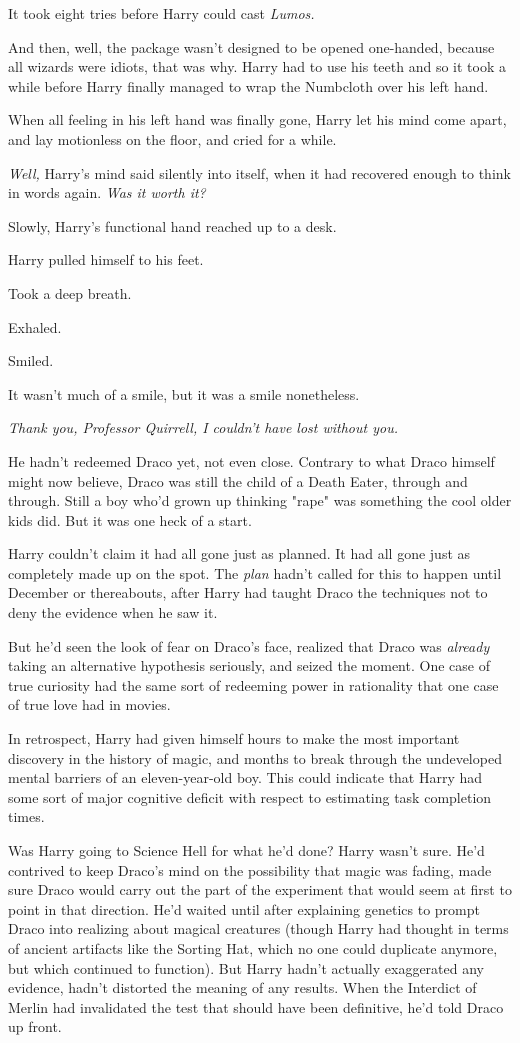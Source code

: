 It took eight tries before Harry could cast \emph{Lumos.}

And then, well, the package wasn't designed to be opened one-handed, because 
all wizards were idiots, that was why. Harry had to use his teeth and so it 
took a while before Harry finally managed to wrap the Numbcloth over his left 
hand.

When all feeling in his left hand was finally gone, Harry let his mind come 
apart, and lay motionless on the floor, and cried for a while.

\emph{Well,} Harry's mind said silently into itself, when it had recovered 
enough to think in words again. \emph{Was it worth it?}

Slowly, Harry's functional hand reached up to a desk.

Harry pulled himself to his feet.

Took a deep breath.

Exhaled.

Smiled.

It wasn't much of a smile, but it was a smile nonetheless.

\emph{Thank you, Professor Quirrell, I couldn't have lost without you.}

He hadn't redeemed Draco yet, not even close. Contrary to what Draco himself 
might now believe, Draco was still the child of a Death Eater, through and 
through. Still a boy who'd grown up thinking "rape" was something the cool 
older kids did. But it was one heck of a start.

Harry couldn't claim it had all gone just as planned. It had all gone just as 
completely made up on the spot. The \emph{plan} hadn't called for this to 
happen until December or thereabouts, after Harry had taught Draco the 
techniques not to deny the evidence when he saw it.

But he'd seen the look of fear on Draco's face, realized that Draco was 
\emph{already} taking an alternative hypothesis seriously, and seized the 
moment. One case of true curiosity had the same sort of redeeming power in 
rationality that one case of true love had in movies.

In retrospect, Harry had given himself hours to make the most important 
discovery in the history of magic, and months to break through the undeveloped 
mental barriers of an eleven-year-old boy. This could indicate that Harry had 
some sort of major cognitive deficit with respect to estimating task completion 
times.

Was Harry going to Science Hell for what he'd done? Harry wasn't sure. He'd 
contrived to keep Draco's mind on the possibility that magic was fading, made 
sure Draco would carry out the part of the experiment that would seem at first 
to point in that direction. He'd waited until after explaining genetics to 
prompt Draco into realizing about magical creatures (though Harry had thought 
in terms of ancient artifacts like the Sorting Hat, which no one could 
duplicate anymore, but which continued to function). But Harry hadn't actually 
exaggerated any evidence, hadn't distorted the meaning of any results. When the 
Interdict of Merlin had invalidated the test that should have been definitive, 
he'd told Draco up front.

